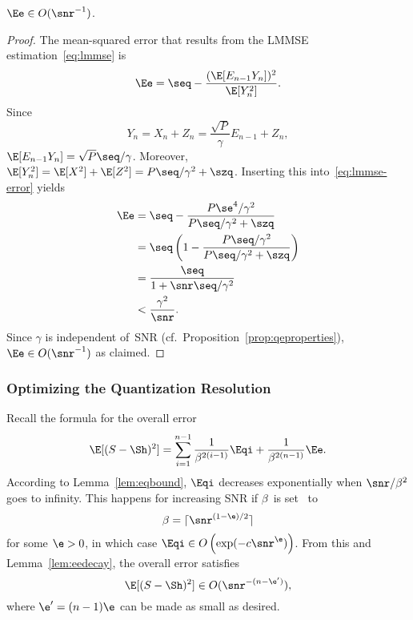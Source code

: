 \begin{lemma}
  \label{lem:eedecay}
  $\Ee \in O(\snr^{-1})$. 
\end{lemma}
\begin{proof}
  The mean-squared error that results from the LMMSE estimation~\eqref{eq:lmmse}
  is
  \begin{equation}
    \label{eq:lmmse-error}
    \Ee = \seq - \frac{(\E[E_{n-1}
    Y_n])^2}{\E[Y_n^2]}. 
  \end{equation}
  Since
  \begin{equation*}
    Y_n = X_n + Z_n = \frac{\sqrt{P}}{\gamma} E_{n-1} + Z_n,
  \end{equation*}
  $\E[E_{n-1}Y_n] = \sqrt{P}\seq/\gamma$. Moreover, $\E[Y_n^2] = \E[X^2]
  + \E[Z^2] = P\seq / \gamma^2 +\szq$.  Inserting this
  into~\eqref{eq:lmmse-error} yields
  \begin{align*}
    \Ee &= \seq - \frac{P \se^4/\gamma^2}{P\seq/\gamma^2 + \szq} \\
    &= \seq \left( 1 - \frac{P\seq/\gamma^2}{P\seq/\gamma^2 + \szq} \right) \\
    &= \frac{\seq}{1 + \snr\seq/\gamma^2} \\
    & < \frac{\gamma^2}{\snr}.
  \end{align*}
  Since $\gamma$ is independent of~SNR (cf.\
  Proposition~\ref{prop:qeproperties}), $\Ee \in O(\snr^{-1})$ as claimed.
\end{proof}


\subsubsection{Optimizing the Quantization Resolution}

Recall the formula for the overall error
\begin{equation*}
  \E[(S-\Sh)^2] = \sum_{i=1}^{n-1} \frac{1}{\beta^{2(i-1)}} \Eqi +
  \frac{1}{\beta^{2(n-1)}} \Ee.
\end{equation*}
According to Lemma~\ref{lem:eqbound}, $\Eqi$ decreases exponentially
when $\snr/\beta^2$ goes to infinity. This happens for increasing SNR if
$\beta$~is set \eg\ to
\begin{equation*}
  \beta = \lceil \snr^{(1-\e)/2} \rceil
\end{equation*}
for some $\e > 0$, in which case $\Eqi \in O\left(\exp(-c \snr^\e) \right)$.
From this and Lemma~\ref{lem:eedecay}, the overall error satisfies
\begin{equation}
  \label{eq:overallO}
  \E[(S-\Sh)^2] \in O(\snr^{-(n - \e')}),
\end{equation}
where $\e' = (n-1)\e$ can be made as small as desired.

